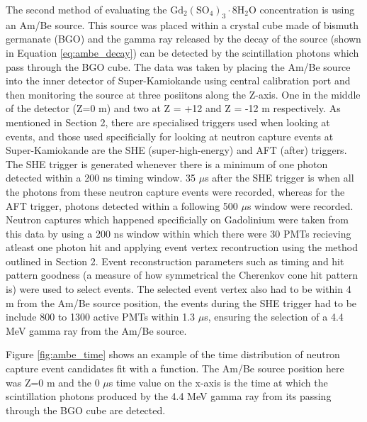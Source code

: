 The second method of evaluating the $\mathrm{Gd}_{2}\left(\mathrm{SO}_{4}\right)_{3} \cdot 8 \mathrm{H}_{2} \mathrm{O}$ concentration is using an Am/Be source. This source was placed within a crystal cube made of bismuth germanate (BGO) and the gamma ray released by the decay of the source (shown in Equation \ref{eq:ambe_decay}) can be detected by the scintillation photons which pass through the BGO cube. The data was taken by placing the Am/Be source into the inner detector of Super-Kamiokande using central calibration port and then monitoring the source at three posiitons along the Z-axis. One in the middle of the detector (Z=0 m) and two at Z = +12 and Z = -12 m respectively. As mentioned in Section 2, there are specialised triggers used when looking at events, and those used specificially for looking at neutron capture events at Super-Kamiokande are the SHE (super-high-energy) and AFT (after) triggers. The SHE trigger is generated whenever there is a minimum of one photon detected within a 200 ns timing window. 35 $\mu$s after the SHE trigger is when all the photons from these neutron capture events were recorded, whereas for the AFT trigger, photons detected within a following 500 $\mu$s window were recorded. Neutron captures which happened specificially on Gadolinium were taken from this data by using a 200 ns window within which there were 30 PMTs recieving atleast one photon hit and applying event vertex recontruction using the method outlined in Section 2. Event reconstruction parameters such as timing and hit pattern goodness (a measure of how symmetrical the Cherenkov cone hit pattern is) were used to select events. The selected event vertex also had to be within 4 m from the Am/Be source position, the events during the SHE trigger had to be include 800 to 1300 active PMTs within 1.3 $\mu$s, ensuring the selection of a 4.4 MeV gamma ray from the Am/Be source. 

Figure \ref{fig:ambe_time} shows an example of the time distribution of neutron capture event candidates fit with a function. The Am/Be source position here was Z=0 m and the 0 $\mu$s time value on the x-axis is the time at which the scintillation photons produced by the 4.4 MeV gamma ray from its passing through the BGO cube are detected. 


